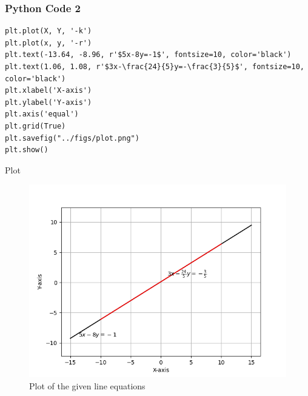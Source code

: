 \documentclass{beamer}
\begin{document}
\begin{frame}[fragile]
    \frametitle{Python Code 2}
    \begin{lstlisting}
plt.plot(X, Y, '-k')
plt.plot(x, y, '-r')
plt.text(-13.64, -8.96, r'$5x-8y=-1$', fontsize=10, color='black')
plt.text(1.06, 1.08, r'$3x-\frac{24}{5}y=-\frac{3}{5}$', fontsize=10, color='black')
plt.xlabel('X-axis')
plt.ylabel('Y-axis')
plt.axis('equal')
plt.grid(True)
plt.savefig("../figs/plot.png")
plt.show()   \end{lstlisting}
\end{frame}

\begin{frame}{Plot}
    \begin{figure}
        \centering
        \includegraphics[width=0.5\columnwidth]{../figs/plot.png}
        \caption{Plot of the given line equations}
        \label{fig:fig}
    \end{figure}
\end{frame}
\end{document}
